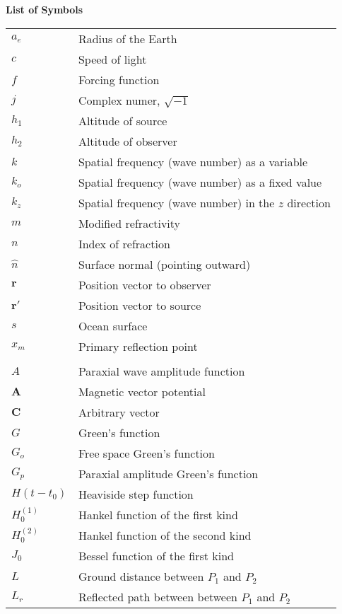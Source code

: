 \noindent\Large{\bf{List of Symbols}}

\vspace{24pt}

\small\normalsize
\begin{supertabular}{ll}
$a_e$ & Radius of the Earth \\
$c$ & Speed of light \\
$f$ & Forcing function \\
$j$ & Complex numer, $\sqrt{-1}$ \\
$h_1$ & Altitude of source\\
$h_2$ & Altitude of observer\\
$k$ & Spatial frequency (wave number) as a variable\\
$k_o$ & Spatial frequency (wave number) as a fixed value \\
$k_z$ & Spatial frequency (wave number) in the $z$ direction \\
$m$ & Modified refractivity \\
$n$ & Index of refraction \\
$\hat{n}$ & Surface normal (pointing outward) \\
$\mathbf{r}$ & Position vector to observer \\
$\mathbf{r}'$ & Position vector to source \\
$s$ & Ocean surface \\
$x_m$ & Primary reflection point \\
\\
$A$ & Paraxial wave amplitude function \\
$\mathbf{A}$ & Magnetic vector potential \\
$\mathbf{C}$ & Arbitrary vector \\
$G$ & Green's function \\
$G_o$ & Free space Green's function \\
$G_p$ & Paraxial amplitude Green’s function \\
$H(t-t_0)$ & Heaviside step function \\
$H_0^{(1)}$ & Hankel function of the first kind \\
$H_0^{(2)}$ & Hankel function of the second kind \\
$J_0$ & Bessel function of the first kind \\
$L$ & Ground distance between $P_1$ and $P_2$\\
$L_r$ & Reflected path between between $P_1$ and $P_2$\\

\end{supertabular}
